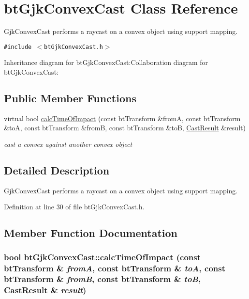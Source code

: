 \hypertarget{classbt_gjk_convex_cast}{
\section{btGjkConvexCast Class Reference}
\label{classbt_gjk_convex_cast}
}
GjkConvexCast performs a raycast on a convex object using support mapping.  


{\tt \#include $<$btGjkConvexCast.h$>$}

Inheritance diagram for btGjkConvexCast:Collaboration diagram for btGjkConvexCast:\subsection*{Public Member Functions}
\begin{CompactItemize}
\item 
virtual bool \hyperlink{classbt_gjk_convex_cast_814009e1ebc582495689f365a42ce2c1}{calcTimeOfImpact} (const btTransform \&fromA, const btTransform \&toA, const btTransform \&fromB, const btTransform \&toB, \hyperlink{structbt_convex_cast_1_1_cast_result}{CastResult} \&result)
\begin{CompactList}\small\item\em cast a convex against another convex object \item\end{CompactList}\end{CompactItemize}


\subsection{Detailed Description}
GjkConvexCast performs a raycast on a convex object using support mapping. 

Definition at line 30 of file btGjkConvexCast.h.

\subsection{Member Function Documentation}
\hypertarget{classbt_gjk_convex_cast_814009e1ebc582495689f365a42ce2c1}{
\subsubsection[calcTimeOfImpact]{\setlength{\rightskip}{0pt plus 5cm}bool btGjkConvexCast::calcTimeOfImpact (const btTransform \& {\em fromA}, \/  const btTransform \& {\em toA}, \/  const btTransform \& {\em fromB}, \/  const btTransform \& {\em toB}, \/  {\bf CastResult} \& {\em result})}}
\label{classbt_gjk_convex_cast_814009e1ebc582495689f365a42ce2c1}


